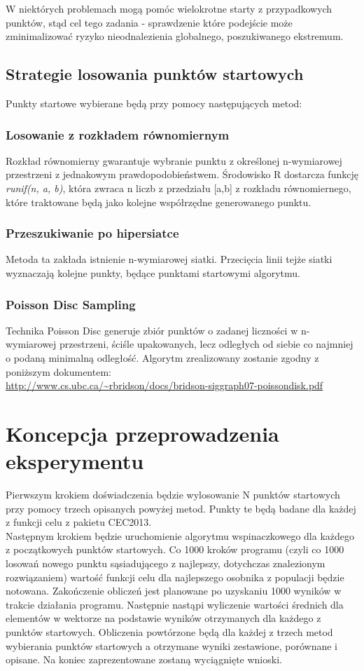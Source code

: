 \documentclass{article}
\begin{document}
W niektórych problemach mogą pomóc wielokrotne starty z przypadkowych punktów, stąd cel tego zadania - sprawdzenie które podejście może zminimalizować ryzyko nieodnalezienia globalnego, poszukiwanego ekstremum.


\subsection{Strategie losowania punktów startowych}
Punkty startowe wybierane będą przy pomocy następujących metod:

\subsubsection{Losowanie z rozkładem równomiernym}
Rozkład równomierny gwarantuje wybranie punktu z określonej n-wymiarowej przestrzeni z jednakowym prawdopodobieństwem. Środowisko R dostarcza funkcję \textit{runif(n, a, b)}, która zwraca n liczb z przedziału [a,b] z rozkładu równomiernego, które traktowane będą jako kolejne współrzędne generowanego punktu.

\subsubsection{Przeszukiwanie po hipersiatce}
Metoda ta zakłada istnienie n-wymiarowej siatki. Przecięcia linii tejże siatki wyznaczają kolejne punkty, będące punktami startowymi algorytmu.

\subsubsection{Poisson Disc Sampling}
Technika Poisson Disc generuje zbiór punktów o zadanej liczności w n-wymiarowej przestrzeni, ściśle upakowanych, lecz odległych od siebie co najmniej o podaną minimalną odległość. Algorytm zrealizowany zostanie zgodny z poniższym dokumentem:\\
\url{http://www.cs.ubc.ca/~rbridson/docs/bridson-siggraph07-poissondisk.pdf}

\section{Koncepcja przeprowadzenia eksperymentu}

Pierwszym krokiem doświadczenia będzie wylosowanie N punktów startowych przy pomocy trzech opisanych powyżej metod. Punkty te będą badane dla każdej z funkcji celu z pakietu CEC2013. \\

Następnym krokiem będzie uruchomienie algorytmu wspinaczkowego dla każdego z początkowych punktów startowych. Co 1000 kroków programu (czyli co 1000 losowań nowego punktu sąsiadującego z najlepszy, dotychczas znalezionym rozwiązaniem) wartość funkcji celu dla najlepszego osobnika z populacji będzie notowana. Zakończenie obliczeń jest planowane po uzyskaniu 1000 wyników w trakcie działania programu. Następnie nastąpi wyliczenie wartości średnich dla elementów w wektorze na podstawie wyników otrzymanych dla każdego z punktów startowych. Obliczenia powtórzone będą dla każdej z trzech metod wybierania punktów startowych a otrzymane wyniki zestawione, porównane i opisane. Na koniec zaprezentowane zostaną wyciągnięte wnioski.
\end{document}
